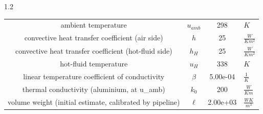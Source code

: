 \documentclass[preview]{standalone}
\begin{document}
\begin{spacing}{1.2}
\begin{tabular}{cccl}
\toprule
ambient temperature & $u_{amb}$ & 298 & $K$ \\ 
convective heat transfer coefficient (air side) & $h$ & 25 & $\frac{W}{K m^2}$ \\ 
convective heat transfer coefficient (hot-fluid side) & $h_{H}$ & 25 & $\frac{W}{K m^2}$ \\ 
hot-fluid temperature & $u_{H}$ & 338 & $K$ \\ 
linear temperature coefficient of conductivity & $\beta$ & 5.00e-04 & $\frac{1}{K}$ \\ 
thermal conductivity (aluminium, at u_amb) & $k_{0}$ & 200 & $\frac{W}{K m}$ \\ 
volume weight (initial estimate, calibrated by pipeline) & $\ell$ & 2.00e+03 & $\frac{W K}{m^3}$ \\ 
\bottomrule
\end{tabular}
\end{spacing}
\end{document}
